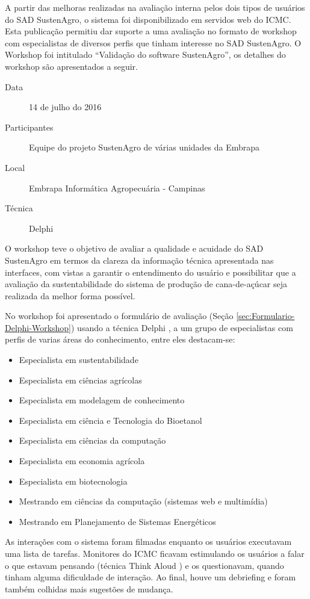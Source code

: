 %
A partir das melhoras realizadas na avaliação interna pelos dois tipos
de usuários do SAD SustenAgro, o sistema foi disponibilizado em servidos
web do ICMC. Esta publicação permitiu dar suporte a uma avaliação
no formato de \foreignlanguage{english}{workshop} com especialistas
de diversos perfis que tinham interesse no SAD SustenAgro. O \foreignlanguage{english}{Workshop}
foi intitulado ``Validação do software SustenAgro'', os detalhes
do \foreignlanguage{english}{workshop} são apresentados a seguir.
\begin{description}
\item [{Data}] 14 de julho do 2016
\item [{Participantes}] Equipe do projeto SustenAgro de várias unidades
da Embrapa
\item [{Local}] Embrapa Informática Agropecuária - Campinas
\item [{Técnica}] Delphi
\end{description}
O \foreignlanguage{english}{workshop} teve o objetivo de avaliar a
qualidade e acuidade do SAD SustenAgro em termos da clareza da informação
técnica apresentada nas interfaces, com vistas a garantir o entendimento
do usuário e possibilitar que a avaliação da sustentabilidade do sistema
de produção de cana-de-açúcar seja realizada da melhor forma possível. 

No \foreignlanguage{english}{workshop} foi apresentado o formulário
de avaliação (Seção \ref{sec:Formulario-Delphi-Workshop}) usando
a técnica \foreignlanguage{english}{Delphi} \citep{wright1985tecnica},
a um grupo de especialistas com perfis de varias áreas do conhecimento,
entre eles destacam-se:
\begin{itemize}
\item Especialista em sustentabilidade
\item Especialista em ciências agrícolas
\item Especialista em modelagem de conhecimento
\item Especialista em ciência e Tecnologia do Bioetanol
\item Especialista em ciências da computação
\item Especialista em economia agrícola
\item Especialista em biotecnologia
\item Mestrando em ciências da computação (sistemas web e multimídia)
\item Mestrando em Planejamento de Sistemas Energéticos
\end{itemize}
As interações com o sistema foram filmadas enquanto os usuários executavam
uma lista de tarefas. Monitores do ICMC ficavam estimulando os usuários
a falar o que estavam pensando (técnica Think Aloud \citep{davey1983think})
e os questionavam, quando tinham alguma dificuldade de interação.
Ao final, houve um \foreignlanguage{english}{debriefing} e foram também
colhidas mais sugestões de mudança. 

